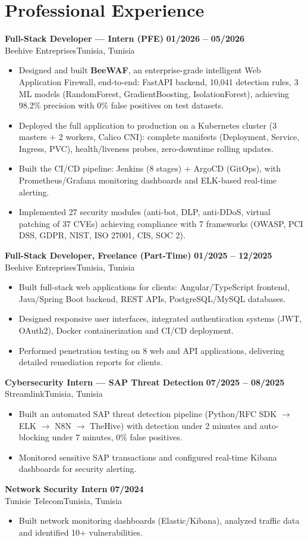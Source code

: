 \documentclass[a4paper,10pt]{article}
\newcommand{\cventry}[4]{\textbf{#1} \hfill \textbf{#4}\\[1pt]#2{\ifx\relax#3\relax\else, #3\fi}\par\vspace{2pt}}
\begin{document}
\section{Professional Experience}
\cventry{Full-Stack Developer --- Intern (PFE)}{Beehive Entreprises}{Tunisia}{01/2026 -- 05/2026}
\begin{itemize}
  \item Designed and built \textbf{BeeWAF}, an enterprise-grade intelligent Web Application Firewall, end-to-end: FastAPI backend, 10,041 detection rules, 3 ML models (RandomForest, GradientBoosting, IsolationForest), achieving 98.2\% precision with 0\% false positives on test datasets.
  \item Deployed the full application to production on a Kubernetes cluster (3 masters + 2 workers, Calico CNI): complete manifests (Deployment, Service, Ingress, PVC), health/liveness probes, zero-downtime rolling updates.
  \item Built the CI/CD pipeline: Jenkins (8 stages) + ArgoCD (GitOps), with Prometheus/Grafana monitoring dashboards and ELK-based real-time alerting.
  \item Implemented 27 security modules (anti-bot, DLP, anti-DDoS, virtual patching of 37 CVEs) achieving compliance with 7 frameworks (OWASP, PCI DSS, GDPR, NIST, ISO 27001, CIS, SOC 2).
\end{itemize}
\cventry{Full-Stack Developer, Freelance (Part-Time)}{Beehive Entreprises}{Tunisia}{01/2025 -- 12/2025}
\begin{itemize}
  \item Built full-stack web applications for clients: Angular/TypeScript frontend, Java/Spring Boot backend, REST APIs, PostgreSQL/MySQL databases.
  \item Designed responsive user interfaces, integrated authentication systems (JWT, OAuth2), Docker containerization and CI/CD deployment.
  \item Performed penetration testing on 8 web and API applications, delivering detailed remediation reports for clients.
\end{itemize}
\cventry{Cybersecurity Intern --- SAP Threat Detection}{Streamlink}{Tunisia}{07/2025 -- 08/2025}
\begin{itemize}
  \item Built an automated SAP threat detection pipeline (Python/RFC SDK $\rightarrow$ ELK $\rightarrow$ N8N $\rightarrow$ TheHive) with detection under 2 minutes and auto-blocking under 7 minutes, 0\% false positives.
  \item Monitored sensitive SAP transactions and configured real-time Kibana dashboards for security alerting.
\end{itemize}
\cventry{Network Security Intern}{Tunisie Telecom}{Tunisia}{07/2024}
\begin{itemize}
  \item Built network monitoring dashboards (Elastic/Kibana), analyzed traffic data and identified 10+ vulnerabilities.
\end{itemize}
\end{document}
